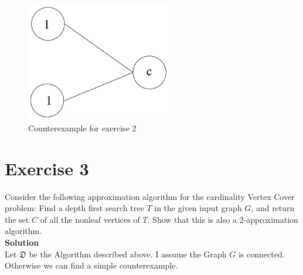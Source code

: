 \documentclass[11pt,a4paper,ngerman]{article}
\begin{document}
\begin{figure}[!h]
	\centering
	\includegraphics[width=2.5in]{ex2_counter}
	\caption{Counterexample for exercise 2}
	\label{fig:2counter}
\end{figure}


\section*{Exercise 3}
Consider the following approximation algorithm for the cardinality Vertex Cover problem: Find a depth first search tree $T$ in the given input graph $G$, and return the set $C$ of all the nonleaf vertices of $T$. Show that this is also a 2-approximation algorithm.\\

\textbf{Solution}\\
Let $\mathfrak{D}$ be the Algorithm described above. I assume the Graph $G$ is connected. Otherwise we can find a simple counterexample.
\end{document}
